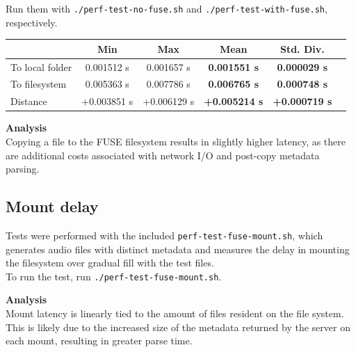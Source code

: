 \documentclass{article}
\begin{document}
	\noindent Run them with \texttt{./perf-test-no-fuse.sh} and \texttt{./perf-test-with-fuse.sh}, respectively.
	
	\vspace{0.25cm}
	\noindent 
	
	\vspace{0.5cm}
	\noindent \begin{tabular}{l*{4}{c}r}
		& Min & Max & Mean & Std. Div. & \\
		\hline
		To local folder & 0.001512 s & 0.001657 s & \textbf{0.001551 s} & \textbf{0.000029 s} &  \\
		To filesystem & 0.005363 s & 0.007786 s & \textbf{0.006765 s} & \textbf{0.000748 s} &  \\
		Distance           & +0.003851 s & +0.006129 s & \textbf{+0.005214 s} & \textbf{+0.000719 s} & \\
	\end{tabular}

	\vspace{0.5cm} 
	
	\noindent \textbf{Analysis} \\
	Copying a file to the FUSE filesystem results in slightly higher latency, as there are additional costs associated with network I/O and post-copy metadata parsing.
	
	\pagebreak
	
	\subsection{Mount delay}
	Tests were performed with the included \texttt{perf-test-fuse-mount.sh}, which generates audio files with distinct metadata and measures the delay in mounting the filesystem over gradual fill with the test files. \\
	
	\noindent To run the test, run \texttt{./perf-test-fuse-mount.sh}.
	
	\vspace{0.25cm}
	\noindent 
	
	\vspace{0.5cm}
	
	\noindent \textbf{Analysis} \\
	Mount latency is linearly tied to the amount of files resident on the file system. This is likely due to the increased size of the metadata returned by the server on each mount, resulting in greater parse time.
\end{document}
